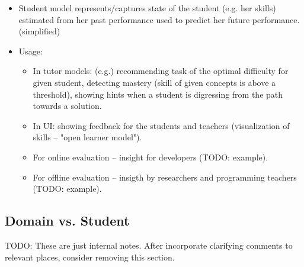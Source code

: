\begin{itemize}
\item Student model represents/captures
  state of the student (e.g. her skills)
  estimated from her past performance
  used to predict her future performance. (simplified)

\item Usage:
  \begin{itemize}
  \item In tutor models: (e.g.)
    recommending task of the optimal difficulty for given student,
    detecting mastery (skill of given concepts is above a threshold),
    showing hints when a student is digressing from the path towards a solution.
  \item In UI: showing feedback for the students and teachers
        (visualization of skills -- "open learner model").
  \item For online evaluation -- insight for developers (TODO: example).
  \item For offline evaluation -- insigth by researchers and programming teachers
  (TODO: example).
  \end{itemize}
\end{itemize}


\subsection{Domain vs. Student}

TODO: These are just internal notes. After incorporate clarifying comments
to relevant places, consider removing this section.

